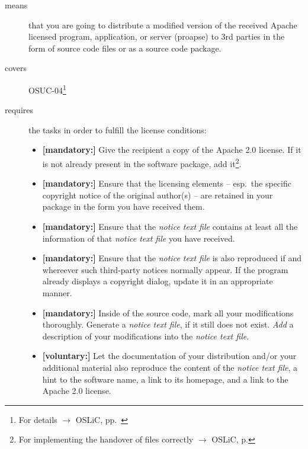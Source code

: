 \begin{description}
\item[means] that you are going to distribute a modified version of the received
Apache licensed program, application, or server (proapse) to 3rd parties in the
form of source code files or as a source code package.
\item[covers] OSUC-04\footnote{For details $\rightarrow$ OSLiC, pp.\ \pageref{OSUC-04-DEF}}
\item[requires] the tasks in order to fulfill the license conditions:
\begin{itemize}
  
  \item \textbf{[mandatory:]} Give the recipient a copy of the Apache 2.0
  license. If it is not already present in the software package, add
  it\footnote{For implementing the handover of files correctly $\rightarrow$
  OSLiC, p. \pageref{DistributingFilesHint}}.

  \item \textbf{[mandatory:]} Ensure that the licensing elements -- esp.\ the
  specific copyright notice of the original author(s) -- are retained in your
  package in the form you have received them.
  
  \item \textbf{[mandatory:]} Ensure that the \emph{notice text file} contains
  at least all the information of that \emph{notice text file} you have
  received.

  \item \textbf{[mandatory:]} Ensure that the \emph{notice text file} is also
  reproduced if and whereever such third-party notices normally appear. If the
  program already displays a copyright dialog, update it in an appropriate
  manner.
  
  \item \textbf{[mandatory:]} Inside of the source code, mark all your
  modifications thoroughly. Generate a \emph{notice text file}, if it still does
  not exist. \emph{Add} a description of your modifications into the
  \emph{notice text file}.
   
  \item \textbf{[voluntary:]} Let the documentation of your distribution and/or
  your additional material also reproduce the content of the \emph{notice text
  file}, a hint to the software name, a link to its homepage, and a link to the
  Apache 2.0 license.
  
 \end{itemize}
 

\end{description}
